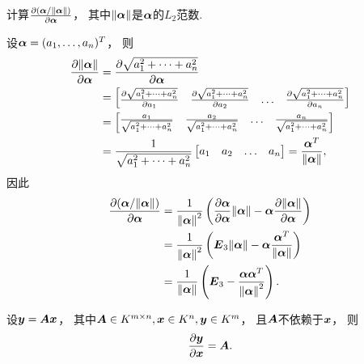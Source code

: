 \begin{example}
计算\(\pdv{(\boldsymbol\alpha / \norm{\boldsymbol\alpha})}{\boldsymbol\alpha}\)，
其中\(\norm{\boldsymbol\alpha}\)是\(\boldsymbol\alpha\)的\(L_2\)范数.
\begin{solution}
设\(\boldsymbol\alpha = (a_1,\dotsc,a_n)^T\)，
则\begin{align*}
	\pdv{\norm{\boldsymbol\alpha}}{\boldsymbol\alpha}
	&= \pdv{\sqrt{a_1^2 + \dotsb + a_n^2}}{\boldsymbol\alpha} \\
	&= \begin{bmatrix}
		\pdv{\sqrt{a_1^2 + \dotsb + a_n^2}}{a_1}
		& \pdv{\sqrt{a_1^2 + \dotsb + a_n^2}}{a_2}
		& \dots
		& \pdv{\sqrt{a_1^2 + \dotsb + a_n^2}}{a_n}
	\end{bmatrix} \\
	&= \begin{bmatrix}
		\frac{a_1}{\sqrt{a_1^2 + \dotsb + a_n^2}}
		& \frac{a_2}{\sqrt{a_1^2 + \dotsb + a_n^2}}
		& \dots
		& \frac{a_n}{\sqrt{a_1^2 + \dotsb + a_n^2}}
	\end{bmatrix} \\
	&= \frac{1}{\sqrt{a_1^2 + \dotsb + a_n^2}}
		\begin{bmatrix}
			a_1 & a_2 & \dots & a_n
		\end{bmatrix}
	= \frac{\boldsymbol\alpha^T}{\norm{\boldsymbol\alpha}},
\end{align*}
因此\begin{align*}
	\pdv{(\boldsymbol\alpha / \norm{\boldsymbol\alpha})}{\boldsymbol\alpha}
	&= \frac{1}{\norm{\boldsymbol\alpha}^2}
		\left(
			\pdv{\boldsymbol\alpha}{\boldsymbol\alpha} \norm{\boldsymbol\alpha}
			- \boldsymbol\alpha \pdv{\norm{\boldsymbol\alpha}}{\boldsymbol\alpha}
		\right) \\
	&= \frac{1}{\norm{\boldsymbol\alpha}^2}
		\left(
			\boldsymbol{E}_3 \norm{\boldsymbol\alpha}
			- \boldsymbol\alpha \frac{\boldsymbol\alpha^T}{\norm{\boldsymbol\alpha}}
		\right) \\
	&= \frac{1}{\norm{\boldsymbol\alpha}}
		\left(
			\boldsymbol{E}_3
			- \frac{\boldsymbol\alpha \boldsymbol\alpha^T}{\norm{\boldsymbol\alpha}^2}
		\right).
\end{align*}
\end{solution}
\end{example}

\begin{proposition}
设\(\boldsymbol{y} = \boldsymbol{A} \boldsymbol{x}\)，
其中\(\boldsymbol{A} \in K^{m \times n}, \boldsymbol{x} \in K^n, \boldsymbol{y} \in K^m\)，
且\(\boldsymbol{A}\)不依赖于\(\boldsymbol{x}\)，
则\begin{equation*}
	\pdv{\boldsymbol{y}}{\boldsymbol{x}}
	= \boldsymbol{A}.
\end{equation*}
\end{proposition}

